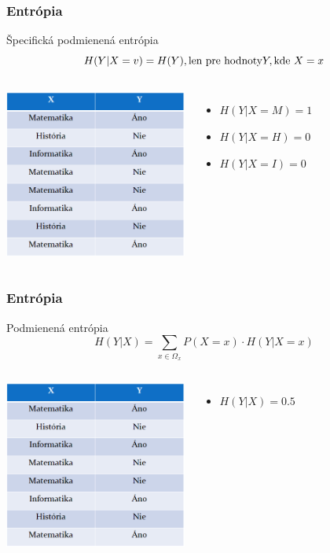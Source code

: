 \documentclass{beamer}
\begin{document}
\begin{frame}
\frametitle{Entrópia}
  \centering
  Špecifická podmienená entrópia
  \begin{equation*}
  H(Y| X = v) = H(Y), \textnormal{len pre hodnoty} Y, \textnormal{kde } X = x 
  \end{equation*}  

\begin{columns}[onlytextwidth,T]


  \column{27mm}
  \includegraphics[width=60mm]{tabulka.png}
  
  \column{\dimexpr\linewidth-60mm-6mm}

  \begin{itemize}
  \item<2-> $H(Y| X = M) = 1$
  \item<3-> $H(Y| X = H) = 0$
  \item<4-> $H(Y| X = I) = 0$
  \end{itemize}
\end{columns}
\end{frame}


\begin{frame}
\frametitle{Entrópia}
  \centering
  Podmienená entrópia
  \begin{equation*}
  H(Y| X) = \sum_{x \in \Omega_x} P(X = x) \cdot H(Y | X = x)
  \end{equation*}  

\begin{columns}[onlytextwidth,T]


  \column{27mm}
  \includegraphics[width=60mm]{tabulka.png}
  
  \column{\dimexpr\linewidth-60mm-6mm}

  \begin{itemize}
  \item<2-> $H(Y|X) = 0.5$
  \end{itemize}
\end{columns}
\end{frame}
\end{document}
